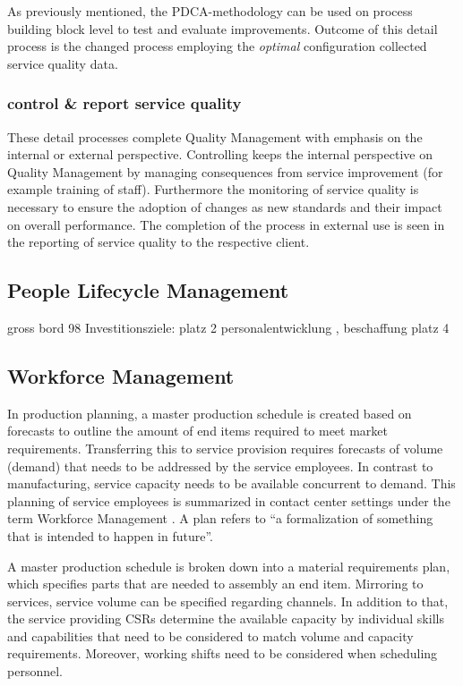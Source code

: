 		As previously mentioned, the \acrshort{PDCA}-methodology can be used on process building block level to test and evaluate improvements. Outcome of this detail process is the changed process employing the \textit{optimal} configuration \wrt collected service quality data.  
		
		\subsubsection{control \& report service quality}
		These detail processes complete Quality Management with emphasis on the internal or external perspective. 
		Controlling keeps the internal perspective on Quality Management by managing consequences from service improvement (for example training of staff). Furthermore the monitoring of service quality is necessary to ensure the adoption of changes as new standards and their impact on overall performance.  
	 	The completion of the process in external use is seen in the reporting of service quality to the respective client. 
	 
	\subsection{People Lifecycle Management}
		\label{sec:plmang}
	
	gross bord 98
	Investitionsziele: platz 2 personalentwicklung \citep{ccnet2016}, beschaffung platz 4
	
	\subsection{Workforce Management}
		\label{sec:wofom}
		In production planning, a master production schedule is created based on forecasts to outline the amount of end items required to meet market requirements. Transferring this to service provision requires forecasts of volume (demand) that needs to be addressed by the service employees. In contrast to manufacturing, service capacity needs to be available concurrent to demand. This planning of service employees is summarized in contact center settings under the term Workforce Management \citep{9781555582777}. A plan refers to \enquote{a formalization of something that is intended to happen in future}\citep[]{9780273756194}. 
		
		A master production schedule is broken down into a material requirements plan, which specifies parts that are needed to assembly an end item. Mirroring to services, service volume can be specified regarding channels. In addition to that, the service providing \acrshort{CSR}s determine the available capacity by individual skills and capabilities that need to be considered to match volume and capacity requirements. Moreover, working shifts need to be considered when scheduling personnel. 
		
